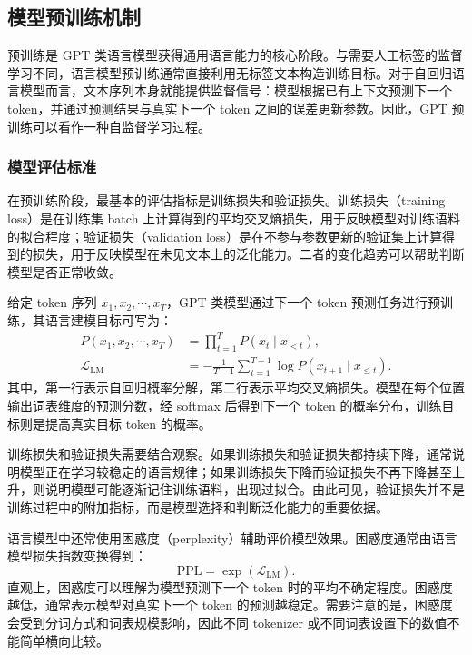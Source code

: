 \documentclass[UTF8,a4paper,zihao=-4,fontset=none]{ctexart}
\numberwithin{equation}{section}
\begin{document}
\subsection{模型预训练机制}

预训练是 GPT 类语言模型获得通用语言能力的核心阶段。与需要人工标签的监督学习不同，语言模型预训练通常直接利用无标签文本构造训练目标。对于自回归语言模型而言，文本序列本身就能提供监督信号：模型根据已有上下文预测下一个 token，并通过预测结果与真实下一个 token 之间的误差更新参数。因此，GPT 预训练可以看作一种自监督学习过程。

\subsubsection{模型评估标准}

在预训练阶段，最基本的评估指标是训练损失和验证损失。训练损失（training loss）是在训练集 batch 上计算得到的平均交叉熵损失，用于反映模型对训练语料的拟合程度；验证损失（validation loss）是在不参与参数更新的验证集上计算得到的损失，用于反映模型在未见文本上的泛化能力。二者的变化趋势可以帮助判断模型是否正常收敛。

给定 token 序列 $x_1,x_2,\cdots,x_T$，GPT 类模型通过下一个 token 预测任务进行预训练，其语言建模目标可写为：
\begin{equation}
\begin{aligned}
P(x_1,x_2,\cdots,x_T)
&=\prod_{t=1}^{T}P(x_t\mid x_{<t}),\\
\mathcal{L}_{\mathrm{LM}}
&=-\frac{1}{T-1}\sum_{t=1}^{T-1}
\log P(x_{t+1}\mid x_{\leq t}) .
\end{aligned}
\label{eq:pretraining_objective}
\end{equation}
其中，第一行表示自回归概率分解，第二行表示平均交叉熵损失。模型在每个位置输出词表维度的预测分数，经 softmax 后得到下一个 token 的概率分布，训练目标则是提高真实目标 token 的概率。

训练损失和验证损失需要结合观察。如果训练损失和验证损失都持续下降，通常说明模型正在学习较稳定的语言规律；如果训练损失下降而验证损失不再下降甚至上升，则说明模型可能逐渐记住训练语料，出现过拟合。由此可见，验证损失并不是训练过程中的附加指标，而是模型选择和判断泛化能力的重要依据。

语言模型中还常使用困惑度（perplexity）辅助评价模型效果。困惑度通常由语言模型损失指数变换得到：
\[
\mathrm{PPL}=\exp(\mathcal{L}_{\mathrm{LM}}).
\]
直观上，困惑度可以理解为模型预测下一个 token 时的平均不确定程度。困惑度越低，通常表示模型对真实下一个 token 的预测越稳定。需要注意的是，困惑度会受到分词方式和词表规模影响，因此不同 tokenizer 或不同词表设置下的数值不能简单横向比较。
\end{document}
